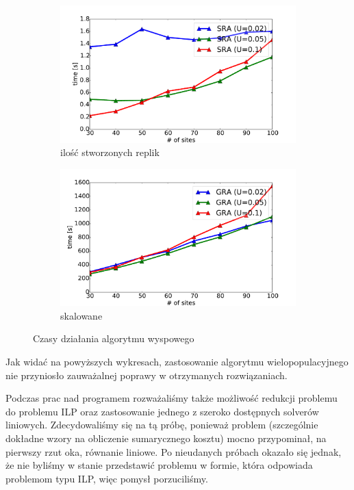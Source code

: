 \documentclass[11pt,pdftex,a4paper]{scrartcl}
\begin{document}
\begin{figure}[H]
    \centering
    \begin{subfigure}[b]{0.49\textwidth} 
        \includegraphics[width=\textwidth]{plots/time_sra_isl}
        \caption{ilość stworzonych replik}
    \end{subfigure}
    \begin{subfigure}[b]{0.49\textwidth}
        \includegraphics[width=\textwidth]{plots/time_gra_isl}
        \caption{skalowane}
    \end{subfigure}

    \caption{Czasy działania algorytmu wyspowego}
    \label{plot:original}
\end{figure}

Jak widać na powyższych wykresach, zastosowanie algorytmu wielopopulacyjnego nie przyniosło zauważalnej
poprawy w otrzymanych rozwiązaniach.

Podczas prac nad programem rozważaliśmy także możliwość redukcji problemu do problemu ILP oraz zastosowanie jednego z szeroko dostępnych solverów liniowych. Zdecydowaliśmy się na tą próbę, ponieważ problem (szczególnie dokładne wzory na obliczenie sumarycznego kosztu) mocno przypominał, na pierwszy rzut oka, równanie liniowe. Po nieudanych próbach okazało się jednak, że nie byliśmy w stanie przedstawić problemu w formie, która odpowiada problemom typu ILP, więc pomysł porzuciliśmy.
\end{document}
